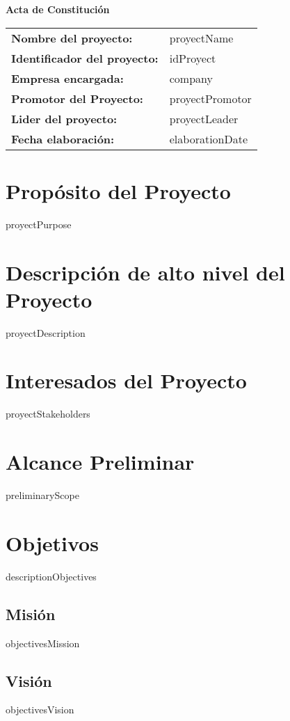 \documentclass[12pt]{article}
\begin{document}
\begin{center}
{\huge\textbf{Acta de Constitución}}\\[13cm]
\end{center}

\begin{tabular}{ll}
\textbf{Nombre del proyecto:} & {{proyectName}} \\[0.3cm]
\textbf{Identificador del proyecto:} & {{idProyect}} \\[0.3cm]
\textbf{Empresa encargada:} & {{company}} \\[0.3cm]
\textbf{Promotor del Proyecto:} & {{proyectPromotor}} \\[0.3cm]
\textbf{Lider del proyecto:} & {{proyectLeader}} \\[0.3cm]
\textbf{Fecha elaboración:} & {{elaborationDate}} \\
\end{tabular}
\newpage

\tableofcontents
\newpage

\section{Propósito del Proyecto}
{{proyectPurpose}}

\section{Descripción de alto nivel del Proyecto}
{{proyectDescription}}

\section{Interesados del Proyecto}
{{proyectStakeholders}}

\section{Alcance Preliminar}
{{preliminaryScope}}

\section{Objetivos}
{{descriptionObjectives}}
\subsection{Misión}
{{objectivesMission}}
\subsection{Visión}
{{objectivesVision}}
\end{document}
